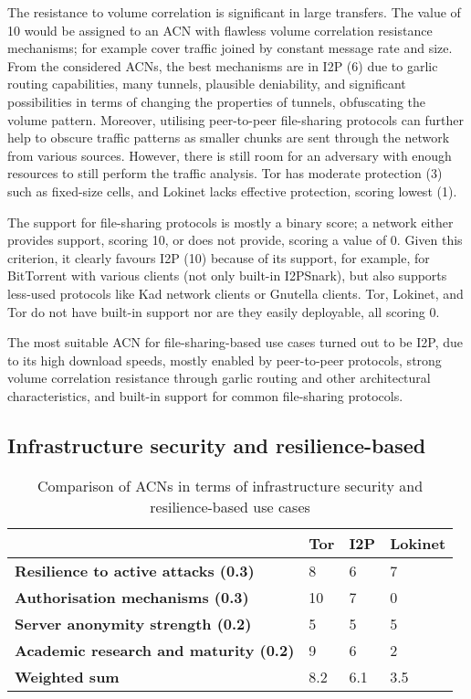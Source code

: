 The resistance to volume correlation is significant in large transfers. The value of 10 would be assigned to an ACN with flawless volume correlation resistance mechanisms; for example cover traffic joined by constant message rate and size. From the considered ACNs, the best mechanisms are in I2P (6) due to garlic routing capabilities, many tunnels, plausible deniability, and significant possibilities in terms of changing the properties of tunnels, obfuscating the volume pattern. Moreover, utilising peer-to-peer file-sharing protocols can further help to obscure traffic patterns as smaller chunks are sent through the network from various sources. However, there is still room for an adversary with enough resources to still perform the traffic analysis. Tor has moderate protection (3) such as fixed-size cells, and Lokinet lacks effective protection, scoring lowest (1).

The support for file-sharing protocols is mostly a binary score; a network either provides support, scoring 10, or does not provide, scoring a value of 0. Given this criterion, it clearly favours I2P (10) because of its support, for example, for BitTorrent with various clients (not only built-in I2PSnark), but also supports less-used protocols like Kad network clients or Gnutella clients. Tor, Lokinet, and Tor do not have built-in support nor are they easily deployable, all scoring 0.

The most suitable ACN for file-sharing-based use cases turned out to be I2P, due to its high download speeds, mostly enabled by peer-to-peer protocols, strong volume correlation resistance through garlic routing and other architectural characteristics, and built-in support for common file-sharing protocols.

\subsection{Infrastructure security and resilience-based}

\begin{table}[!ht]
\caption{Comparison of ACNs in terms of infrastructure security and resilience-based use cases}
\label{tab:security_resilience_uc}
\small
\begin{tabular}{|p{}|p{}|p{}|p{}|}
\hline
\textbf{} & \textbf{Tor} & \textbf{I2P} & \textbf{Lokinet} \\
\hline
\textbf{Resilience to active attacks (0.3)} & 8 & 6 & 7 \\
\hline
\textbf{Authorisation mechanisms (0.3)} & 10 & 7 & 0 \\
\hline
\textbf{Server anonymity strength (0.2)} & 5 & 5 & 5 \\
\hline
\textbf{Academic research and maturity (0.2)} & 9 & 6 & 2 \\
\hline
\textbf{Weighted sum} & 8.2 & 6.1 & 3.5 \\
\hline
\end{tabular}
\end{table}

